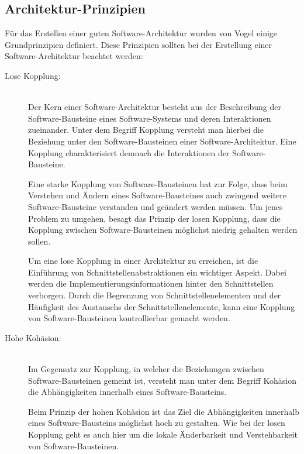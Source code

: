 \subsection{Architektur-Prinzipien\label{subsec2.1.1:Unterunterpunkt-1}}

Für das Erstellen einer guten Software-Architektur wurden von Vogel \cite[S. 128-147]{Vogel.2009} einige Grundprinzipien definiert. Diese Prinzipien sollten bei der Erstellung einer Software-Architektur beachtet werden: \cite[S. 128-147]{Vogel.2009}

\begin{description}
    \item[Lose Kopplung:]\hfill \\
    Der Kern einer Software-Architektur besteht aus der Beschreibung der Software-Bausteine eines Software-Systems und deren Interaktionen zueinander. Unter dem Begriff Kopplung versteht man hierbei die Beziehung unter den Software-Bausteinen einer Software-Architektur. Eine Kopplung charakterisiert demnach die Interaktionen der Software-Bausteine.

    Eine starke Kopplung von Software-Bausteinen hat zur Folge, dass beim Verstehen und Ändern eines Software-Bausteines auch zwingend weitere Software-Bausteine verstanden und geändert werden müssen. Um jenes Problem zu umgehen, besagt das Prinzip der losen Kopplung, dass die Kopplung zwischen Software-Bausteinen möglichst niedrig gehalten werden sollen.

    Um eine lose Kopplung in einer Architektur zu erreichen, ist die Einführung von Schnittstellenabstraktionen ein wichtiger Aspekt. Dabei werden die Implementierungsinformationen hinter den Schnittstellen verborgen. Durch die Begrenzung von Schnittstellenelementen und der Häufigkeit des Austauschs der Schnittstellenelemente, kann eine Kopplung von Software-Bausteinen kontrollierbar gemacht werden.

    \item[Hohe Kohäsion:]\hfill \\
    Im Gegensatz zur Kopplung, in welcher die Beziehungen zwischen Software-Bausteinen gemeint ist, versteht man unter dem Begriff Kohäsion die Abhängigkeiten innerhalb eines Software-Bausteins.

    Beim Prinzip der hohen Kohäsion ist das Ziel die Abhängigkeiten innerhalb eines Software-Bausteins möglichst hoch zu gestalten. Wie bei der losen Kopplung geht es auch hier um die lokale Änderbarkeit und Verstehbarkeit von Software-Bausteinen.
    

\end{description}
